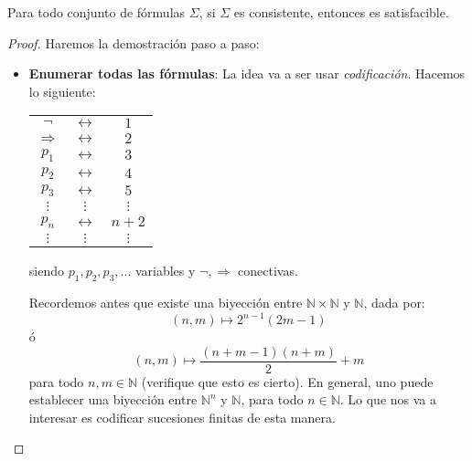 \documentclass[12pt]{report}
\theoremstyle{largebreak}
\newcounter{tablec}
\begin{document}
    \begin{lema}
        \label{demConsist}
        Para todo conjunto de fórmulas $\Sigma$, si $\Sigma$ es consistente, entonces es satisfacible.
    \end{lema}

    \begin{proof}
        Haremos la demostración paso a paso:
        \begin{itemize}
            \item \textbf{Enumerar todas las fórmulas}: La idea va a ser usar \textit{codificación}. Hacemos lo siguiente:
            \begin{center}
                \begin{tabular}{ccc}
                    $\neg$ & $\longleftrightarrow$ & $1$ \\
                    $\Rightarrow$ & $\longleftrightarrow$ & $2$ \\
                    $p_1$ & $\longleftrightarrow$ & $3$ \\
                    $p_2$ & $\longleftrightarrow$ & $4$ \\
                    $p_3$ & $\longleftrightarrow$ & $5$ \\
                    $\vdots$ & $\vdots$ & $\vdots$ \\
                    $p_n$ & $\longleftrightarrow$ & $n+2$ \\
                    $\vdots$ & $\vdots$ & $\vdots$ \\
                \end{tabular}
            \end{center}
            siendo $p_1,p_2,p_3,...$ variables y $\neg,\Rightarrow$ conectivas.

            Recordemos antes que existe una biyección entre $\mathbb{N}\times\mathbb{N}$ y $\mathbb{N}$, dada por:
            \begin{equation*}
                (n,m)\mapsto 2^{ n-1}(2m-1)
            \end{equation*}
            ó
            \begin{equation*}
                (n,m)\mapsto\frac{(n+m-1)(n+m)}{2}+m
            \end{equation*}
            para todo $n,m\in\mathbb{N}$ (verifique que esto es cierto). En general, uno puede establecer una biyección entre $\mathbb{N}^n$ y $\mathbb{N}$, para todo $n\in\mathbb{N}$. Lo que nos va a interesar es codificar sucesiones finitas de esta manera.


\end{itemize}
\end{proof}
\end{document}
